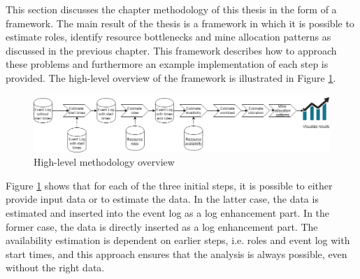 

This section discusses the chapter methodology of this thesis in the form of a framework. The main result of the thesis is a framework in which it is possible to estimate roles, identify resource bottlenecks and mine allocation patterns as discussed in the previous chapter. This framework describes how to approach these problems and furthermore an example implementation of each step is provided. The high-level overview of the framework is illustrated in Figure \ref{fig:framework}.


\begin{figure}[h]
  \includegraphics[width=\textwidth]{figures/methodology}
  \caption{High-level methodology overview}
  \label{fig:framework}
\end{figure}



Figure \ref{fig:framework} shows that for each of the three initial steps, it is possible to either provide input data or to estimate the data. In the latter case, the data is estimated and inserted into the event log as a log enhancement part. In the former case, the data is directly inserted as a log enhancement part. The availability estimation is dependent on earlier steps, i.e. roles and event log with start times, and this approach ensures that the analysis is always possible, even without the right data. 

